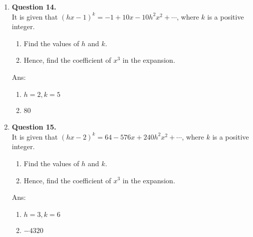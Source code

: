 \documentclass[12pt]{article}
\begin{document}
\begin{enumerate}
	\item {\bf Question 14.}\\
	It is given that $(hx-1)^k = -1+10x-10h^2x^2 + \cdots$, where $k$ is a positive integer.
	\begin{enumerate}
		\item Find the values of $h$ and $k$.
		\item Hence, find the coefficient of $x^3$ in the expansion.
	\end{enumerate}
	Ans:
	\begin{enumerate}
		\item $h = 2, k = 5$
		\item 80
	\end{enumerate}

	\item {\bf Question 15.}\\
	It is given that $(hx-2)^k = 64-576x+240h^2x^2 + \cdots$, where $k$ is a positive integer.
	\begin{enumerate}
		\item Find the values of $h$ and $k$.
		\item Hence, find the coefficient of $x^3$ in the expansion.
	\end{enumerate}
	Ans:
	\begin{enumerate}
		\item $h = 3, k = 6$
		\item $-4320$
	\end{enumerate}\end{enumerate}
\end{document}
